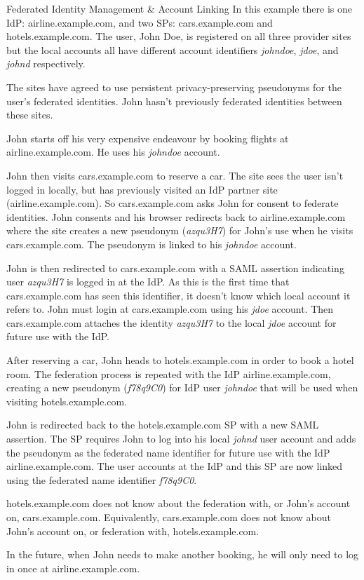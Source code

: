 \begin{example}{Federated Identity Management \& Account Linking}
In this example there is one IdP: airline.example.com, and two SPs: cars.example.com and hotels.example.com. The user, John Doe, is registered on all three provider sites but the local accounts all have different account identifiers \textit{johndoe}, \textit{jdoe}, and \textit{johnd} respectively.

The sites have agreed to use persistent privacy-preserving pseudonyms for the user's federated identities. John hasn't previously federated identities between these sites.

John starts off his very expensive endeavour by booking flights at airline.example.com. He uses his \textit{johndoe} account.

John then visits cars.example.com to reserve a car. The site sees the user isn't logged in locally, but has previously visited an IdP partner site (airline.example.com). So cars.example.com asks John for consent to federate identities. John consents and his browser redirects back to airline.example.com where the site creates a new pseudonym (\textit{azqu3H7}) for John's use when he visits cars.example.com. The pseudonym is linked to his \textit{johndoe} account. 

John is then redirected to cars.example.com with a SAML assertion indicating user \textit{azqu3H7} is logged in at the IdP. As this is the first time that cars.example.com has seen this identifier, it doesn't know which local account it refers to. John must login at cars.example.com using his \textit{jdoe} account. Then cars.example.com attaches the identity \textit{azqu3H7} to the local \textit{jdoe} account for future use with the IdP. 

After reserving a car, John heads to hotels.example.com in order to book a hotel room. The federation process is repeated with the IdP airline.example.com, creating a new pseudonym (\textit{f78q9C0}) for IdP user \textit{johndoe} that will be used when visiting hotels.example.com. 

John is redirected back to the hotels.example.com SP with a new SAML assertion. The SP requires John to log into his local \textit{johnd} user account and adds the pseudonym as the federated name identifier for future use with the IdP airline.example.com. The user accounts at the IdP and this SP are now linked using the federated name identifier \textit{f78q9C0}.

hotels.example.com does not know about the federation with, or John's account on, cars.example.com. Equivalently, cars.example.com does not know about John's account on, or federation with, hotels.example.com. 

In the future, when John needs to make another booking, he will only need to log in once at airline.example.com.

\end{example}